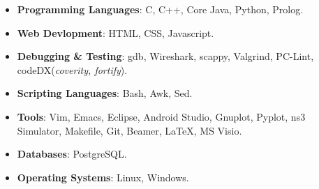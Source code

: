 \begin{multicols}{2}
\begin{itemize}
  \item \textbf{Programming Languages}: C, C++, Core Java, Python, Prolog.\\[-0.6cm]
  \item \textbf{Web Devlopment}: HTML, CSS, Javascript.\\[-0.6cm]
  \item \textbf{Debugging \& Testing}: gdb, Wireshark, scappy, Valgrind, PC-Lint, codeDX(\textit{coverity, fortify}).
\end{itemize}
\columnbreak
\begin{itemize}
 \item \textbf{Scripting Languages}: Bash, Awk, Sed.\\[-0.6cm]
  \item \textbf{Tools}: Vim, Emacs, Eclipse, Android Studio, Gnuplot, Pyplot, ns3 Simulator, Makefile, Git, Beamer, \LaTeX, MS Visio.\\[-0.6cm]
    \item \textbf{Databases}: PostgreSQL. \\[-0.6cm]
  \item \textbf{Operating Systems}: Linux, Windows.\\[-0.6cm]
\end{itemize}
\end{multicols}

